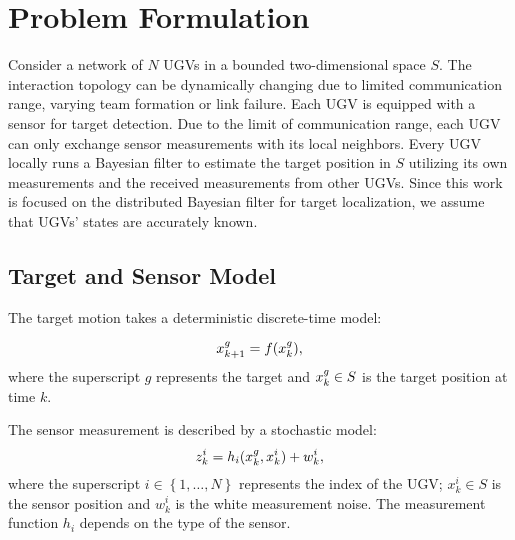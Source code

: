 \section{Problem Formulation}\label{sec:prob}
	Consider a network of $N$ UGVs in a bounded two-dimensional space $S$. 
	The interaction topology can be dynamically changing due to limited communication range, varying team formation or link failure.
	Each UGV is equipped with a sensor for target detection. 
	Due to the limit of communication range, each UGV can only exchange sensor measurements with its local neighbors. 
	Every UGV locally runs a Bayesian filter to estimate the target position in $S$ utilizing its own measurements and the received measurements from other UGVs. 
	Since this work is focused on the distributed Bayesian filter for target localization, we assume that UGVs' states are accurately known.
	
	\subsection{Target and Sensor Model}
	The target motion takes a deterministic discrete-time model: %
	
	\begin{equation}
		\small
		\label{eqn:tar_motion_model}
		\xg_{k+1}=f(\xg_k), %
	\end{equation}\normalsize
	where the superscript $g$ represents the target and $x^g_k\in S$ is the target position at time $k$. %
	
	The sensor measurement is described by a stochastic model:
	\begin{equation}\label{eqn:meas_model}
		z^i_k = h_i(x^g_k,x^i_k)+w^i_k,
	\end{equation}
	where the superscript $i\in\left\lbrace 1,\dots,N\right\rbrace$ represents the index of the UGV; $x^i_k\in S$ is the sensor position and $w^i_k$ is the white measurement noise.
	The measurement function $h_i$ depends on the type of the sensor. 
	
